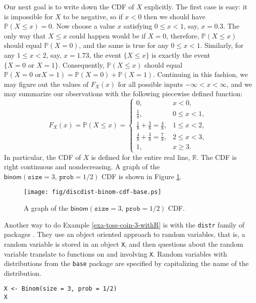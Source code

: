Our next goal is to write down the CDF of \(X\) explicitly. The first
case is easy: it is impossible for \(X\) to be negative, so if \(x<0\)
then we should have \(\mathbb{P}(X\leq x)=0\). Now choose a value
\(x\) satisfying \(0\leq x<1\), say, \(x=0.3\). The only way that
\(X\leq x\) could happen would be if \(X=0\), therefore,
\(\mathbb{P}(X\leq x)\) should equal \(\mathbb{P}(X=0)\), and the same
is true for any \(0\leq x<1\). Similarly, for any \(1\leq x<2\), say,
\(x=1.73\), the event \(\{ X\leq x \}\) is exactly the event \(\{
X=0\mbox{ or }X=1 \}\). Consequently, \(\mathbb{P}(X\leq x)\) should
equal \(\mathbb{P}(X=0\mbox{ or
}X=1)=\mathbb{P}(X=0)+\mathbb{P}(X=1)\). Continuing in this fashion,
we may figure out the values of \(F_{X}(x)\) for all possible inputs
\(-\infty<x<\infty\), and we may summarize our observations with the
following piecewise defined function: \[ F_{X}(x)=\mathbb{P}(X\leq x) = \begin{cases} 0, & x < 0,\\ \frac{1}{8}, & 0\leq x < 1,\\ \frac{1}{8} + \frac{3}{8} = \frac{4}{8}, & 1\leq x < 2,\\ \frac{4}{8} + \frac{3}{8} = \frac{7}{8}, & 2\leq x < 3,\\ 1, & x \geq 3. \end{cases} \]
In particular, the CDF of \(X\) is defined for the entire real line,
\(\mathbb{R}\). The CDF is right continuous and nondecreasing. A graph
of the \(\mathsf{binom}(\mathtt{size}=3,\,\mathtt{prob}=1/2)\) CDF is
shown in Figure \ref{fig-binom-cdf-base}.

\begin{figure}[ht!]
\centering
\texttt{[image: fig/discdist-binom-cdf-base.ps]}
\caption[Graph of the \(\mathsf{binom}(\mathtt{size}=3,\,\mathtt{prob}=1/2)\) CDF]{\label{fig-binom-cdf-base}\small A graph of the \(\mathsf{binom}(\mathtt{size}=3,\,\mathtt{prob}=1/2)\) CDF.}
\end{figure}


Another way to do Example \ref{exa-toss-coin-3-withR} is with the \texttt{distr}
family of packages \cite{distr}. They use an object oriented approach
to random variables, that is, a random variable is stored in an object
\texttt{X}, and then questions about the random variable translate to
functions on and involving \texttt{X}. Random variables with distributions
from the \texttt{base} package\cite{base} are specified by capitalizing the
name of the distribution.

\begin{verbatim}
X <- Binom(size = 3, prob = 1/2)
X
\end{verbatim}

